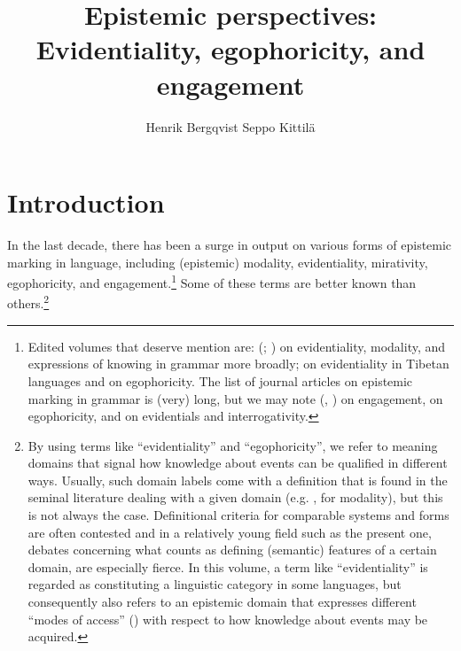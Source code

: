 \documentclass[output=paper]{langsci/langscibook}
\author{Henrik Bergqvist\affiliation{Stockholm University} \lastand Seppo Kittilä\affiliation{University of Helsinki}}
\title{Epistemic perspectives: Evidentiality, egophoricity, and engagement}
\begin{document}
\maketitle

\section{Introduction}\label{s:hb1}
In the last decade, there has been a surge in output on various forms of epistemic marking in language, including (epistemic) modality, evidentiality, mirativity, egophoricity, and engagement.\footnote{Edited volumes that deserve mention are: \citeauthor{AikhenvaldDixon2003} (\citeyear{AikhenvaldDixon2003}; \citeyear{AikhenvaldDixon2014}) on evidentiality, modality, and expressions of knowing in grammar more broadly; \cite{GawneHill2017} on evidentiality in Tibetan languages and \cite{SanRoqueetal2018} on egophoricity. The list of journal articles on epistemic marking in grammar is (very) long, but we may note \citeauthor{Evansetal2017a} (\citeyear{Evansetal2017a}, \citeyear{Evansetal2017b}) on engagement, \cite{BergqvistKnuchel2017} on egophoricity, and \cite{SanRoqueetal2017} on evidentials and interrogativity.}
Some of these terms are better known than others.\footnote{By using terms like “evidentiality” and “egophoricity”, we refer to meaning domains that signal how knowledge about events can be qualified in different ways. Usually, such domain labels come with a definition that is found in the seminal literature dealing with a given domain (e.g. \citealt{Palmer2001}, for modality), but this is not always the case. Definitional criteria for comparable systems and forms are often contested and in a relatively young field such as the present one, debates concerning what counts as defining (semantic) features of a certain domain, are especially fierce. In this volume, a term like “evidentiality” is regarded as constituting a linguistic category in some languages, but consequently also refers to an epistemic domain that expresses different “modes of access” (\citealt{Plungian2010}) with respect to how knowledge about events may be acquired.} 
\end{document}
